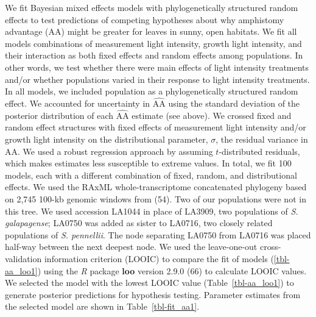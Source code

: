 \documentclass[
  letterpaper,
  DIV=11,
  numbers=noendperiod]{scrartcl}
\newcommand{\aax}{$\mathrm{AA}$}
\begin{document}
We fit Bayesian mixed effects models with phylogenetically structured
random effects to test predictions of competing hypotheses about why
amphistomy advantage (\aax) might be greater for leaves in sunny, open
habitats. We fit all models combinations of measurement light intensity,
growth light intensity, and their interaction as both fixed effects and
random effects among populations. In other words, we test whether there
were main effects of light intensity treatments and/or whether
populations varied in their response to light intensity treatments. In
all models, we included population as a phylogenetically structured
random effect. We accounted for uncertainty in \(\widehat{\mathrm{AA}}\)
using the standard deviation of the posterior distribution of each
\(\widehat{\mathrm{AA}}\) estimate (see above). We crossed fixed and
random effect structures with fixed effects of measurement light
intensity and/or growth light intensity on the distributional parameter,
\(\sigma\), the residual variance in \aax{}. We used a robust regression
approach by assuming \(t\)-distributed residuals, which makes estimates
less susceptible to extreme values. In total, we fit 100 models, each
with a different combination of fixed, random, and distributional
effects. We used the RAxML whole-transcriptome concatenated phylogeny
based on 2,745 100-kb genomic windows from (54). Two of our populations
were not in this tree. We used accession LA1044 in place of LA3909, two
populations of \emph{S. galapagense}; LA0750 was added as sister to
LA0716, two closely related populations of \emph{S. pennellii}. The node
separating LA0750 from LA0716 was placed half-way between the next
deepest node. We used the leave-one-out cross-validation information
criterion (LOOIC) to compare the fit of models (\autoref{tbl-aa_loo1})
using the \emph{R} package \textbf{loo} version 2.9.0 (66) to calculate
LOOIC values. We selected the model with the lowest LOOIC value
(Table~\ref{tbl-aa_loo1}) to generate posterior predictions for
hypothesis testing. Parameter estimates from the selected model are
shown in Table~\ref{tbl-fit_aa1}.
\end{document}
